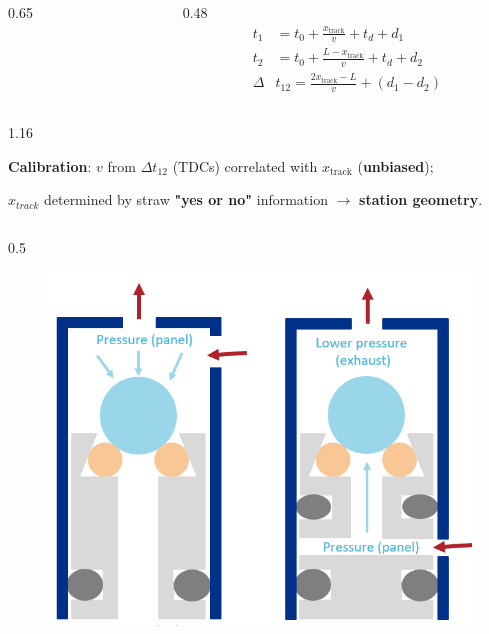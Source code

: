 \documentclass{beamer}
\begin{document}
\begin{frame}
\begin{columns}
\begin{column}{0.65\framewidth}
\begin{itemize}
{                }   
            \end{itemize}
        \end{column}
        \begin{column}{0.48\framewidth}
            \begin{equation*}
\begin{aligned}
    t_1 &= t_0 + \frac{x_{\text{track}}}{v} + t_d + d_1 \\
    t_2 &= t_0 + \frac{L - x_{\text{track}}}{v} + t_d + d_2 \\
    \Delta & t_{12} = \frac{2x_{\text{track}}-L}{v} +(d_1-d_2)
\end{aligned}
\end{equation*}
\vspace{-3mm}
        \end{column}
    \end{columns}
    \vspace{-1.5mm}
    \begin{columns}
        \begin{column}{1.16\framewidth}
                        \setlength{\leftmargini}{1.28em}
            \begin{itemize}
               {\small 
                \item \textbf{Calibration}: $v$ from $\Delta t_{12}$ (TDCs) correlated with $x_{\text{track}}$ (\textbf{unbiased});
                \vspace{-0.5mm}
               \item $x_{track}$ determined by straw \textbf{"yes or no"} information $\rightarrow$ \textbf{station geometry}.}
            \end{itemize}
        \end{column}
    \end{columns}
    \begin{columns}
        \begin{column}{0.5 \framewidth}
         \vspace{-3mm}
            \begin{figure}[!h]
    \centering
    \includegraphics[width =0.8\columnwidth]{figures/png/gassystem.png}

\end{figure}
\end{column}
\end{columns}
\end{frame}
\end{document}

